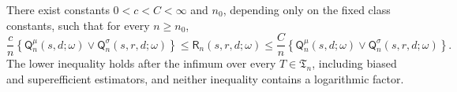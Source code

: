 There exist constants \(0<c<C<\infty\) and \(n_0\), depending only on the fixed class constants, such that for every \(n\ge n_0\), \[\frac{c}{n}\left\{\mathsf Q_n^{\mu}(s,d;\omega)\vee\mathsf Q_n^{\sigma}(s,r,d;\omega)\right\}\le \mathsf R_n(s,r,d;\omega)\le\frac{C}{n}\left\{\mathsf Q_n^{\mu}(s,d;\omega)\vee\mathsf Q_n^{\sigma}(s,r,d;\omega)\right\}.\] The lower inequality holds after the infimum over every \(T\in\mathfrak T_n\), including biased and superefficient estimators, and neither inequality contains a logarithmic factor.